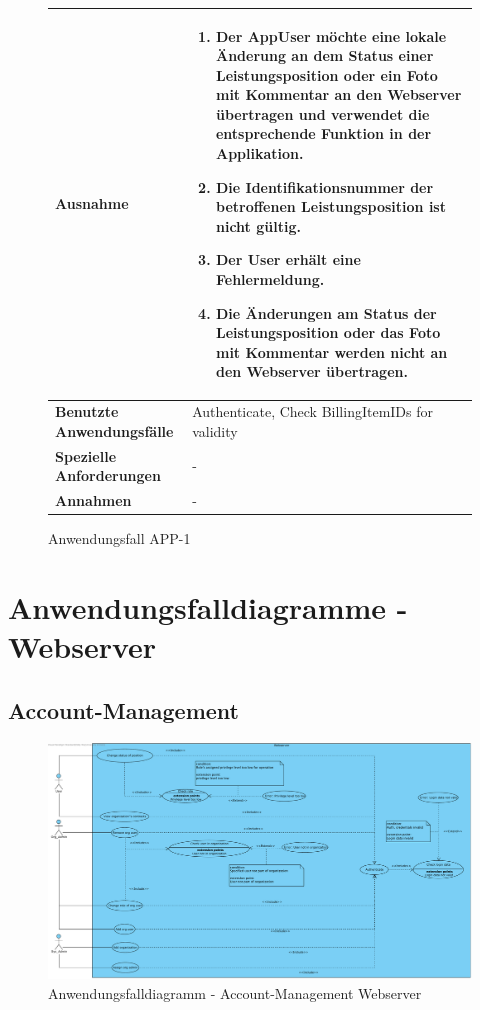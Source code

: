 			\begin{figure}[h]
	\centering
	\begin{tabularx}{\textwidth}{ X | X }
						\textbf{Ausnahme} &
				\begin{enumerate}
					 \item Der AppUser m\"ochte eine lokale \"Anderung an dem Status einer Leistungsposition oder ein Foto mit Kommentar an den Webserver \"ubertragen und verwendet die entsprechende Funktion in der Applikation. 
					 \item Die Identifikationsnummer der betroffenen Leistungsposition ist nicht g\"ultig.
					 \item Der User erh\"alt eine Fehlermeldung.
					 \item Die \"Anderungen am Status der Leistungsposition oder das Foto mit Kommentar werden nicht an den Webserver \"ubertragen.
				\end{enumerate} \\ \hline
		\textbf{Benutzte Anwendungsfälle} & Authenticate,  Check BillingItemIDs for validity\\ \hline
		\textbf{Spezielle Anforderungen} & - \\ \hline
		\textbf{Annahmen} & -
	\end{tabularx}
	\caption{Anwendungsfall APP-1}
	\label{fig:anwendungsfall-app-tabelle-APP-1-4}
\end{figure}

\clearpage

\section{Anwendungsfalldiagramme - Webserver}

\subsection{Account-Management}

\begin{figure}[h]
	\centering
	\includegraphics[width=\linewidth]{img/diagrams/Acc_Management_Web.pdf}
	\caption{Anwendungsfalldiagramm - Account-Management Webserver}
	\label{fig:anwendungsfalldiagramm-acc}
\end{figure}

